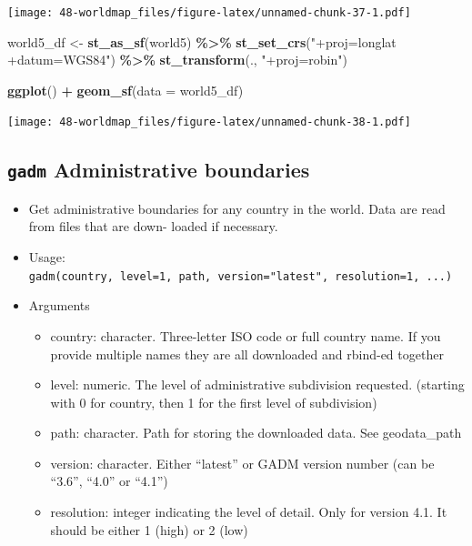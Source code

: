 \documentclass[
  xelatex, ja=standard]{bxjsbook}
\newenvironment{Shaded}{\begin{snugshade}}{\end{snugshade}}
\newcommand{\AttributeTok}[1]{\textcolor[rgb]{0.13,0.29,0.53}{#1}}
\newcommand{\FunctionTok}[1]{\textcolor[rgb]{0.13,0.29,0.53}{\textbf{#1}}}
\newcommand{\NormalTok}[1]{#1}
\newcommand{\OtherTok}[1]{\textcolor[rgb]{0.56,0.35,0.01}{#1}}
\newcommand{\SpecialCharTok}[1]{\textcolor[rgb]{0.81,0.36,0.00}{\textbf{#1}}}
\newcommand{\StringTok}[1]{\textcolor[rgb]{0.31,0.60,0.02}{#1}}
\providecommand{\tightlist}{%
  \setlength{\itemsep}{0pt}\setlength{\parskip}{0pt}}
\theoremstyle{definition}
\theoremstyle{definition}
\theoremstyle{definition}
\theoremstyle{definition}
\theoremstyle{remark}
\begin{document}
\texttt{[image: 48-worldmap\_files/figure-latex/unnamed-chunk-37-1.pdf]}

\begin{Shaded}
\begin{Highlighting}[]
\NormalTok{world5\_df }\OtherTok{\textless{}{-}} \FunctionTok{st\_as\_sf}\NormalTok{(world5) }\SpecialCharTok{\%\textgreater{}\%} 
  \FunctionTok{st\_set\_crs}\NormalTok{(}\StringTok{"+proj=longlat +datum=WGS84"}\NormalTok{) }\SpecialCharTok{\%\textgreater{}\%} 
  \FunctionTok{st\_transform}\NormalTok{(., }\StringTok{"+proj=robin"}\NormalTok{)}

\FunctionTok{ggplot}\NormalTok{() }\SpecialCharTok{+}
  \FunctionTok{geom\_sf}\NormalTok{(}\AttributeTok{data =}\NormalTok{ world5\_df)}
\end{Highlighting}
\end{Shaded}

\texttt{[image: 48-worldmap\_files/figure-latex/unnamed-chunk-38-1.pdf]}

\hypertarget{gadm-administrative-boundaries}{%
\subsection{\texorpdfstring{\texttt{gadm} Administrative boundaries}{gadm Administrative boundaries}}\label{gadm-administrative-boundaries}}

\begin{itemize}
\tightlist
\item
  Get administrative boundaries for any country in the world. Data are read from files that are down- loaded if necessary.
\item
  Usage: \texttt{gadm(country,\ level=1,\ path,\ version="latest",\ resolution=1,\ ...)}
\item
  Arguments

  \begin{itemize}
  \tightlist
  \item
    country: character. Three-letter ISO code or full country name. If you provide multiple names they are all downloaded and rbind-ed together
  \item
    level: numeric. The level of administrative subdivision requested. (starting with 0 for country, then 1 for the first level of subdivision)
  \item
    path: character. Path for storing the downloaded data. See geodata\_path
  \item
    version: character. Either ``latest'' or GADM version number (can be ``3.6'', ``4.0'' or ``4.1'')
  \item
    resolution: integer indicating the level of detail. Only for version 4.1. It should be either 1 (high) or 2 (low)
  \end{itemize}
\end{itemize}
\end{document}
